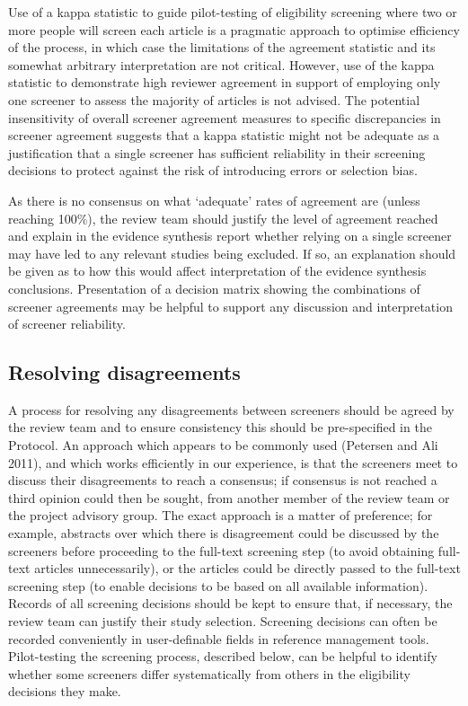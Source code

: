 \documentclass[
  letterpaper,
  DIV=11,
  numbers=noendperiod]{scrreprt}
\begin{document}
Use of a kappa statistic to guide pilot-testing of eligibility screening
where two or more people will screen each article is a pragmatic
approach to optimise efficiency of the process, in which case the
limitations of the agreement statistic and its somewhat arbitrary
interpretation are not critical. However, use of the kappa statistic to
demonstrate high reviewer agreement in support of employing only one
screener to assess the majority of articles is not advised. The
potential insensitivity of overall screener agreement measures to
specific discrepancies in screener agreement suggests that a kappa
statistic might not be adequate as a justification that a single
screener has sufficient reliability in their screening decisions to
protect against the risk of introducing errors or selection bias.

As there is no consensus on what `adequate' rates of agreement are
(unless reaching 100\%), the review team should justify the level of
agreement reached and explain in the evidence synthesis report whether
relying on a single screener may have led to any relevant studies being
excluded. If so, an explanation should be given as to how this would
affect interpretation of the evidence synthesis conclusions.
Presentation of a decision matrix showing the combinations of screener
agreements may be helpful to support any discussion and interpretation
of screener reliability.

\subsection{Resolving disagreements}\label{resolving-disagreements}

A process for resolving any disagreements between screeners should be
agreed by the review team and to ensure consistency this should be
pre-specified in the Protocol. An approach which appears to be commonly
used (Petersen and Ali 2011), and which works efficiently in our
experience, is that the screeners meet to discuss their disagreements to
reach a consensus; if consensus is not reached a third opinion could
then be sought, from another member of the review team or the project
advisory group. The exact approach is a matter of preference; for
example, abstracts over which there is disagreement could be discussed
by the screeners before proceeding to the full-text screening step (to
avoid obtaining full-text articles unnecessarily), or the articles could
be directly passed to the full-text screening step (to enable decisions
to be based on all available information). Records of all screening
decisions should be kept to ensure that, if necessary, the review team
can justify their study selection. Screening decisions can often be
recorded conveniently in user-definable fields in reference management
tools. Pilot-testing the screening process, described below, can be
helpful to identify whether some screeners differ systematically from
others in the eligibility decisions they make.
\end{document}

